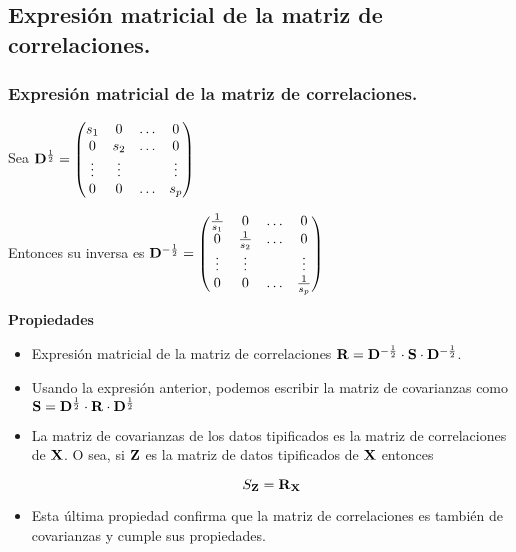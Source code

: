 \subsection{Expresión matricial de la matriz de correlaciones.}

\begin{frame}

\frametitle{Expresión matricial de la matriz de correlaciones.}


Sea $\mathbf{D}^{\frac{1}{2}}
=
\begin{pmatrix}
 s_1 & 0 & \ldots & 0\\
0 & s_2  & \ldots & 0\\
\vdots & \vdots & & \vdots\\
0 & 0 & \ldots  & s_p  
\end{pmatrix}
$

Entonces su inversa es 
$
\mathbf{D}^{-\frac{1}{2}}=
\begin{pmatrix} 
\frac{1}{s_1} & 0 & \ldots & 0\\
 0 & \frac{1}{s_2}  & \ldots & 0\\
 \vdots & \vdots & & \vdots\\
 0 & 0 & \ldots  & \frac{1}{s_p}
\end{pmatrix}
$


\end{frame}
\begin{frame}

\textbf{Propiedades}

\begin{itemize}
\item Expresión matricial de la matriz de correlaciones $\mathbf{R}= \mathbf{D}^{-\frac{1}{2}}\cdot\mathbf{S}\cdot \mathbf{D}^{-\frac{1}{2}}$.
\item Usando la expresión anterior, podemos escribir la matriz de covarianzas como $\mathbf{S}= \mathbf{D}^{\frac{1}{2}}\cdot\mathbf{R}\cdot \mathbf{D}^{\frac{1}{2}}$
 \item La matriz de covarianzas de los datos tipificados es la matriz de correlaciones de $\mathbf{X}$. O sea, si
$\mathbf{Z}$ es la matriz de datos tipificados de $\mathbf{X}$ entonces

 $$S_{\mathbf{Z}}=\mathbf{R}_{\mathbf{X}}$$
 \item Esta última propiedad confirma que la matriz de correlaciones es también de covarianzas y cumple sus propiedades.
\end{itemize}

\end{frame}



